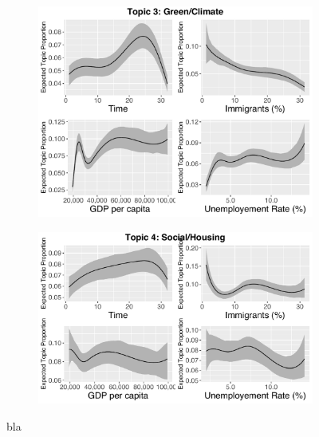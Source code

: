 \begin{figure}[h!]
  \centering
  \begin{subfigure}[b]{0.4\linewidth}
    \includegraphics[width=\linewidth]{../plots/appendix/5_1/beta_t3_cont.pdf}
  \end{subfigure}
  \begin{subfigure}[b]{0.4\linewidth}
    \includegraphics[width=\linewidth]{../plots/appendix/5_1/beta_t4_cont.pdf}
  \end{subfigure}
  \caption{bla}
  \label{fig:coffee}
\end{figure}

